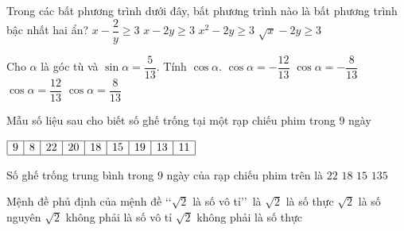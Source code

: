 \begin{ex}%
	Trong các bất phương trình dưới đây, bất phương trình nào là bất phương trình bậc nhất hai ẩn?
	\choice
	{$x-\dfrac{2}{y}\ge 3$}
	{\True $x-2y\ge 3$}
	{$x^2-2y\ge 3$}
	{$\sqrt{x}-2y\ge 3$}
\end{ex}
\begin{ex}%
	Cho $\alpha$ là góc tù và $\sin\alpha=\dfrac{5}{13}$. Tính $\cos\alpha$.
	\choice
	{\True $\cos\alpha=-\dfrac{12}{13}$}
	{$\cos\alpha=-\dfrac{8}{13}$}
	{$\cos\alpha=\dfrac{12}{13}$}
	{$\cos\alpha=\dfrac{8}{13}$}
\end{ex}
\begin{ex}%
	Mẫu số liệu sau cho biết số ghế trống tại một rạp chiếu phim trong $9$ ngày
	\begin{center}
		$\begin{array}{|c|c|c|c|c|c|c|c|c|}
		\hline
		9 & 8 & 22 & 20 & 18 & 15 & 19 & 13 & 11 \\
		\hline
	\end{array}$
	\end{center}
	Số ghế trống trung bình trong $9$ ngày của rạp chiếu phim trên là
	\choice
	{$22$}
	{$18$}
	{\True $15$}
	{$135$}
\end{ex}
\begin{ex}%
	Mệnh đề phủ định của mệnh đề \lq\lq $\sqrt{2}$ là số vô tỉ\rq\rq\, là
	\choice
	{$\sqrt{2}$ là số thực}
	{$\sqrt{2}$ là số nguyên}
	{\True $\sqrt{2}$ không phải là số vô tỉ}
	{$\sqrt{2}$ không phải là số thực}
\end{ex}
